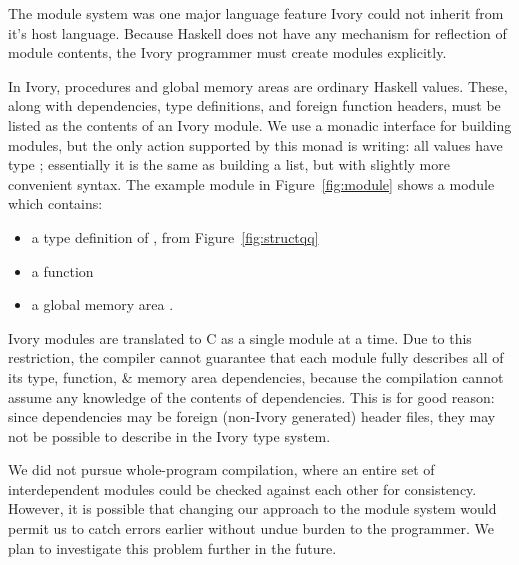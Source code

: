 


The module system was one major language feature Ivory could not inherit from
it's host language. Because Haskell does not have any mechanism for reflection
of module contents, the Ivory programmer must create modules explicitly.

In Ivory, procedures and global memory areas are ordinary Haskell values. These,
along with dependencies, type definitions, and foreign function headers, must be
listed as the contents of an Ivory module. We use a monadic interface for
building modules, but the only action supported by this  monad
is writing: all values have type ; essentially it is the same as
building a list, but with slightly more convenient syntax. The example module
in Figure~\ref{fig:module} shows a module  which contains:
\begin{itemize}
  \item a type definition of , from Figure~\ref{fig:structqq}
  \item a function 
  \item a global memory area .
\end{itemize}

Ivory modules are translated to C as a single module at a time. Due to this
restriction, the compiler cannot guarantee that each module fully describes all
of its type, function, \& memory area dependencies, because the compilation
cannot assume any knowledge of the contents of dependencies. This is for good
reason: since dependencies may be foreign (non-Ivory generated) header files,
they may not be possible to describe in the Ivory type system.

We did not pursue whole-program compilation, where an entire set of
interdependent modules could be checked against each other for consistency.
However, it is possible that changing our approach to the module system would
permit us to catch errors earlier without undue burden to the programmer. We
plan to investigate this problem further in the future.



